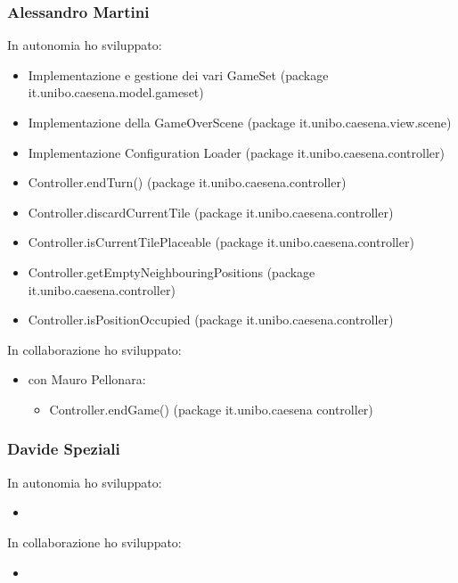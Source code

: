 \subsubsection*{Alessandro Martini}
In autonomia ho sviluppato:
\begin{itemize}
    \item Implementazione e gestione dei vari GameSet (package it.unibo.caesena.model.gameset)
    \item Implementazione della GameOverScene (package it.unibo.caesena.view.scene)
    \item Implementazione Configuration Loader (package it.unibo.caesena.controller) 
    \item Controller.endTurn() (package it.unibo.caesena.controller)
    \item Controller.discardCurrentTile (package it.unibo.caesena.controller)
    \item Controller.isCurrentTilePlaceable (package it.unibo.caesena.controller)
    \item Controller.getEmptyNeighbouringPositions (package it.unibo.caesena.controller)
    \item Controller.isPositionOccupied (package it.unibo.caesena.controller)
\end{itemize}
In collaborazione ho sviluppato:
\begin{itemize}
    \item con Mauro Pellonara: 
    \begin{itemize}
        \item Controller.endGame() (package it.unibo.caesena controller)
    \end{itemize}
\end{itemize}

\subsubsection*{Davide Speziali}
In autonomia ho sviluppato:
\begin{itemize}
    \item 
\end{itemize}
In collaborazione ho sviluppato:
\begin{itemize}
    \item 
\end{itemize}


